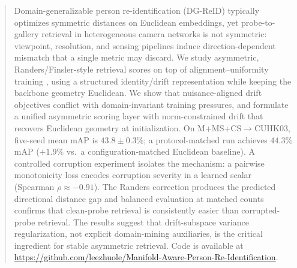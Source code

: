 \begin{abstract}
Domain-generalizable person re-identification (DG-ReID) typically optimizes symmetric distances on Euclidean embeddings, yet probe-to-gallery retrieval in heterogeneous camera networks is not symmetric: viewpoint, resolution, and sensing pipelines induce direction-dependent mismatch that a single metric may discard. We study asymmetric, Randers/Finsler-style retrieval scores on top of alignment–uniformity training \cite{cho2024generalizable}, using a structured identity/drift representation while keeping the backbone geometry Euclidean. We show that nuisance-aligned drift objectives conflict with domain-invariant training pressures, and formulate a unified asymmetric scoring layer with norm-constrained drift that recovers Euclidean geometry at initialization. On M+MS+CS$\to$CUHK03, five-seed mean mAP is $43.8\pm0.3\%$; a protocol-matched run achieves $44.3\%$ mAP ($+1.9\%$ vs.\ a configuration-matched Euclidean baseline). A controlled corruption experiment isolates the mechanism: a pairwise monotonicity loss encodes corruption severity in a learned scalar (Spearman $\rho\!\approx\!{-0.91}$). The Randers correction produces the predicted directional distance gap and balanced evaluation at matched counts confirms that clean-probe retrieval is consistently easier than corrupted-probe retrieval. The results suggest that drift-subspace variance regularization, not explicit domain-mining auxiliaries, is the critical ingredient for stable asymmetric retrieval. Code is available at \url{https://github.com/leezhuole/Manifold-Aware-Person-Re-Identification}.
\end{abstract}